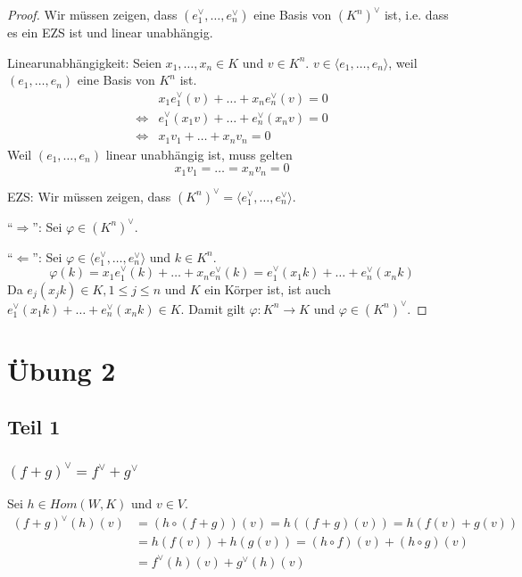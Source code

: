 \documentclass[a4paper,10pt]{article}
\begin{document}
\begin{proof}
 Wir müssen zeigen, dass $(e_1^\vee, \dots, e_n^\vee)$ eine Basis von $(K^n)^\vee$ ist, i.e. dass es ein EZS ist und linear unabhängig.
 
 Linearunabhängigkeit: Seien $x_1, \dots, x_n \in K$ und $v \in K^n$.
 $v \in \langle e_1, \dots, e_n \rangle$, weil $(e_1, \dots, e_n)$ eine Basis von $K^n$ ist.
 \begin{align}
  & x_1e_1^\vee(v) + \dots + x_ne_n^\vee(v) = 0\\
  \Leftrightarrow & e_1^\vee(x_1v) + \dots + e_n^\vee(x_nv) = 0\\
  \Leftrightarrow & x_1v_1 + \dots + x_nv_n = 0
 \end{align}
 Weil $(e_1, \dots, e_n)$ linear unabhängig ist, muss gelten
 \begin{equation}
  x_1v_1 = \dots = x_nv_n = 0
 \end{equation}

 EZS: Wir müssen zeigen, dass $(K^n)^\vee = \langle e_1^\vee, \dots, e_n^\vee \rangle$.
 
 ``$\Rightarrow$'': Sei $\varphi \in (K^n)^\vee$.
 
 
 ``$\Leftarrow$'': Sei $\varphi \in \langle e_1^\vee, \dots, e_n^\vee \rangle$ und $k \in K^n$.
 \begin{equation}
  \varphi(k) = x_1e_1^\vee(k) + \dots + x_ne_n^\vee(k) = e_1^\vee(x_1k) + \dots + e_n^\vee(x_nk)
 \end{equation}
 Da $e_j(x_jk) \in K, 1 \le j \le n$ und $K$ ein Körper ist, ist auch $e_1^\vee(x_1k) + \dots + e_n^\vee(x_nk) \in K$.
 Damit gilt $\varphi: K^n \rightarrow K$ und $\varphi \in (K^n)^\vee$.
\end{proof}

\section*{Übung 2}

\subsection*{Teil 1}

\subsubsection*{$(f + g)^\vee = f^\vee + g^\vee$}

Sei $h \in Hom(W, K)$ und $v \in V$.
\begin{align}
 (f + g)^\vee(h)(v) & = (h \circ (f + g))(v) = h((f + g)(v)) = h(f(v) + g(v))\\
 & = h(f(v)) + h(g(v)) = (h \circ f)(v) + (h \circ g)(v)\\
 & = f^\vee(h)(v) + g^\vee(h)(v)
\end{align}
\end{document}
